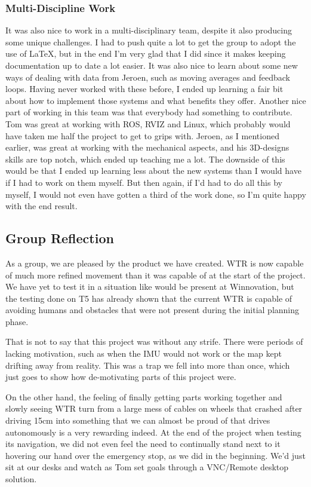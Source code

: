 \subsubsection{Multi-Discipline Work}
It was also nice to work in a multi-disciplinary team, despite it also producing some unique challenges.
I had to push quite a lot to get the group to adopt the use of \LaTeX, but in the end I'm very glad that I did since it makes keeping documentation up to date a lot easier.
It was also nice to learn about some new ways of dealing with data from Jeroen, such as moving averages and feedback loops.
Having never worked with these before, I ended up learning a fair bit about how to implement those systems and what benefits they offer.
Another nice part of working in this team was that everybody had something to contribute.
Tom was great at working with ROS, RVIZ and Linux, which probably would have taken me half the project to get to grips with.
Jeroen, as I mentioned earlier, was great at working with the mechanical aspects, and his 3D-designs skills are top notch, which ended up teaching me a lot.
The downside of this would be that I ended up learning less about the new systems than I would have if I had to work on them myself.
But then again, if I'd had to do all this by myself, I would not even have gotten a third of the work done, so I'm quite happy with the end result.

\subsection{Group Reflection}
As a group, we are pleased by the product we have created.
WTR is now capable of much more refined movement than it was capable of at the start of the project.
We have yet to test it in a situation like would be present at Winnovation, but the testing done on T5 has already shown that the current WTR is capable of avoiding humans and obstacles that were not present during the initial planning phase.

That is not to say that this project was without any strife.
There were periods of lacking motivation, such as when the IMU would not work or the map kept drifting away from reality.
This was a trap we fell into more than once, which just goes to show how de-motivating parts of this project were.

On the other hand, the feeling of finally getting parts working together and slowly seeing WTR turn from a large mess of cables on wheels that crashed after driving 15cm into something that we can almost be proud of that drives autonomously is a very rewarding indeed.
At the end of the project when testing its navigation, we did not even feel the need to continually stand next to it hovering our hand over the emergency stop, as we did in the beginning.
We'd just sit at our desks and watch as Tom set goals through a VNC/Remote desktop solution.

